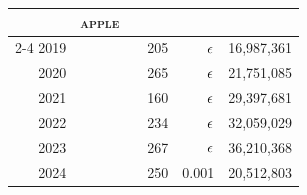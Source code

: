\begin{table}
\begin{tabular}{r@{\hskip 1.5em}rrr r@{\hskip 1.5em}rrr}
& \multicolumn{3}{c}{\textsc{\MakeLowercase{Apple}}} & & & & \\ \cmidrule{2-4}
\color{lowlight} 2019 &             &        &           &          &        205 & $\epsilon$ & \color{lowlight} 16,987,361 \\
\color{lowlight} 2020 &             &        &           &          &        265 & $\epsilon$ & \color{lowlight} 21,751,085 \\
\color{lowlight} 2021 &             &        &           &          &        160 & $\epsilon$ & \color{lowlight} 29,397,681 \\
\color{lowlight} 2022 &             &        &           &          &        234 & $\epsilon$ & \color{lowlight} 32,059,029 \\
\color{lowlight} 2023 &             &        &           &          &        267 & $\epsilon$ & \color{lowlight} 36,210,368 \\
\color{lowlight} 2024 &             &        &           &          &        250 &    0.001 & \color{lowlight} 20,512,803 \\

\bottomrule
\end{tabular}
\end{table}

